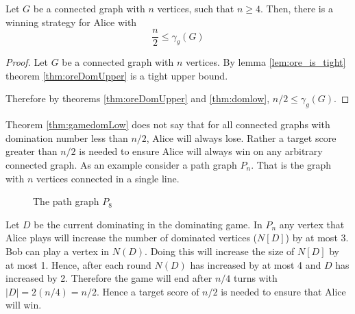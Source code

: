 \begin{theorem}\label{thm:gamedomLow}
    Let $G$ be a connected graph with $n$ vertices, such that $n \geq 4$. Then, there is a winning strategy for Alice with    
    \[  \frac{n}{2} \leq \gamma_g(G)  \]    
\end{theorem}
\begin{proof}
    Let $G$ be a connected graph with $n$ vertices. 
    By lemma \ref{lem:ore_is_tight} theorem \ref{thm:oreDomUpper} is a tight upper bound.
        
    Therefore by theorems \ref{thm:oreDomUpper} and \ref{thm:domlow}, $ n/2 \leq \gamma_g(G)$.
\end{proof}

Theorem \ref{thm:gamedomLow} does not say that for all connected graphs with domination number less than $n/2$, Alice will always lose. Rather a target score greater than $n/2$ is needed to ensure Alice will always win on any arbitrary connected graph. As an example consider a path graph $P_n$. That is the graph with $n$ vertices connected in a single line. 
\begin{figure}[h]
    \centering
    \caption{The path graph $P_8$}
\end{figure}
Let $D$ be the current dominating in the dominating game. In $P_n$ any vertex that Alice plays will increase the number of dominated vertices ($N[D]$) by at most 3. Bob can play a vertex in $N(D)$. Doing this will increase the size of $N[D]$ by at most 1. Hence, after each round $N(D)$ has increased by at most 4 and $D$ has increased by 2. Therefore the game will end after $n/4$ turns with $|D| = 2(n/4) = n/2$. Hence a target score of $n/2$ is needed to ensure that Alice will win.


